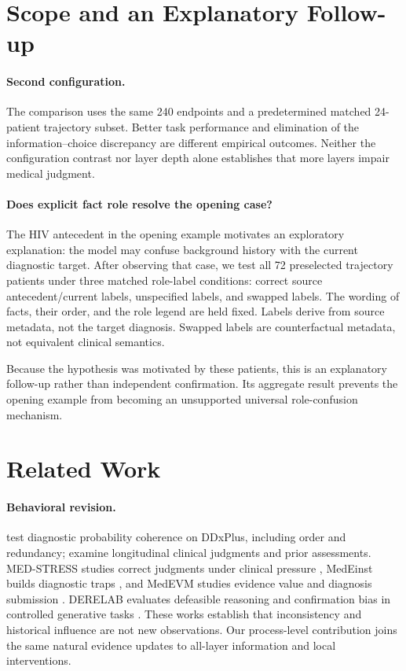 \documentclass[11pt]{article}
\begin{document}
\section{Scope and an Explanatory Follow-up}
\paragraph{Second configuration.}

The comparison uses the same 240 endpoints and a predetermined matched 24-patient trajectory subset. Better task performance and elimination of the information--choice discrepancy are different empirical outcomes. Neither the configuration contrast nor layer depth alone establishes that more layers impair medical judgment.

\paragraph{Does explicit fact role resolve the opening case?}
The HIV antecedent in the opening example motivates an exploratory explanation: the model may confuse background history with the current diagnostic target. After observing that case, we test all 72 preselected trajectory patients under three matched role-label conditions: correct source antecedent/current labels, unspecified labels, and swapped labels. The wording of facts, their order, and the role legend are held fixed. Labels derive from source metadata, not the target diagnosis. Swapped labels are counterfactual metadata, not equivalent clinical semantics.

Because the hypothesis was motivated by these patients, this is an explanatory follow-up rather than independent confirmation. Its aggregate result prevents the opening example from becoming an unsupported universal role-confusion mechanism.

\section{Related Work}
\paragraph{Behavioral revision.}
\citet{arun2026} test diagnostic probability coherence on DDxPlus, including order and redundancy; \citet{zeng2026} examine longitudinal clinical judgments and prior assessments. MED-STRESS studies correct judgments under clinical pressure \citep{medstress}, MedEinst builds diagnostic traps \citep{medeinst}, and MedEVM studies evidence value and diagnosis submission \citep{medevm}. DERELAB evaluates defeasible reasoning and confirmation bias in controlled generative tasks \citep{derelab}. These works establish that inconsistency and historical influence are not new observations. Our process-level contribution joins the same natural evidence updates to all-layer information and local interventions.
\end{document}
